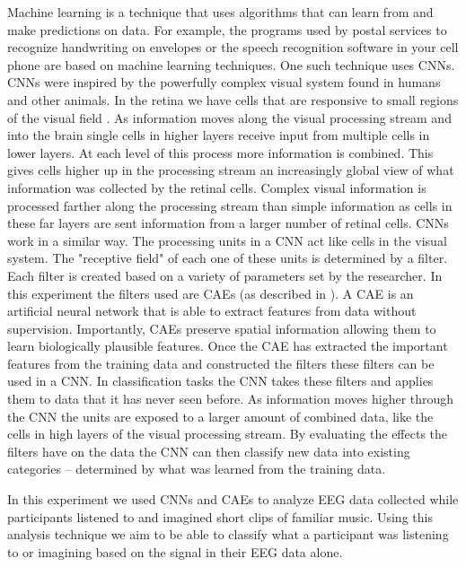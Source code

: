 Machine learning is a technique that uses algorithms that can learn from and make predictions on data.
For example, the programs used by postal services to recognize handwriting on envelopes or the speech recognition software in your cell phone are based on machine learning techniques.
One such technique uses \acp{CNN}. 
\acp{CNN} were inspired by the powerfully complex visual system found in humans and other animals.
In the retina we have cells that are responsive to small regions of the visual field \cite{hubel_receptive_1963}. 
As information moves along the visual processing stream and into the brain single cells in higher layers receive input from multiple cells in lower layers.
At each level of this process more information is combined.
This gives cells higher up in the processing stream an increasingly global view of what information was collected by the retinal cells.
Complex visual information is processed farther along the processing stream than simple information as cells in these far layers are sent information from a larger number of retinal cells.
\acp{CNN} work in a similar way.
The processing units in a \ac{CNN} act like cells in the visual system.
The "receptive field" of each one of these units is determined by a filter.
Each filter is created based on a variety of parameters set by the researcher.
In this experiment the filters used are \acp{CAE} (as described in \cite{masci_stacked_2011}).
A \ac{CAE} is an artificial neural network that is able to extract features from data without supervision.
Importantly, \acp{CAE} preserve spatial information allowing them to learn biologically plausible features.
Once the \ac{CAE} has extracted the important features from the training data and constructed the filters these filters can be used in a \ac{CNN}.
In classification tasks the \ac{CNN} takes these filters and applies them to data that it has never seen before.
As information moves higher through the \ac{CNN} the units are exposed to a larger amount of combined data, like the cells in high layers of the visual processing stream. 
By evaluating the effects the filters have on the data the \ac{CNN} can then classify new data into existing categories -- determined by what was learned from the training data.

In this experiment we used \acp{CNN} and \acp{CAE} to analyze EEG data collected while participants listened to and imagined short clips of familiar music. 
Using this analysis technique we aim to be able to classify what a participant was listening to or imagining based on the signal in their EEG data alone. 









